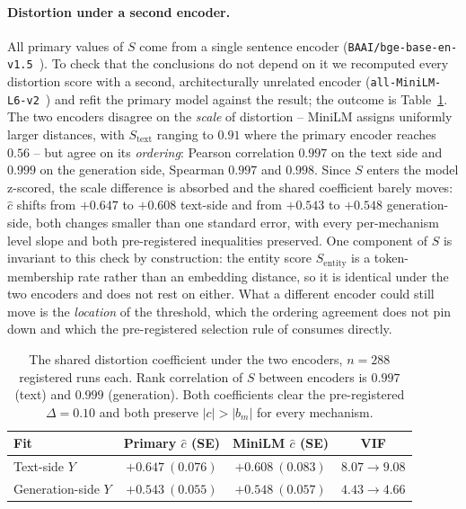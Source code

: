\paragraph{Distortion under a second encoder.}
All primary values of $S$ come from a single sentence encoder (\texttt{BAAI/\allowbreak bge-base-\allowbreak en-v1.5}~\citep{xiao2024cpack}).
To check that the conclusions do not depend on it we recomputed every distortion score with a second,
architecturally unrelated encoder (\texttt{all-\allowbreak MiniLM-\allowbreak L6-v2}~\citep{wang2020minilm, reimers2019sbert}) and refit the primary model against the result;
the outcome is Table~\ref{tab:encoder}.
The two encoders disagree on the \textit{scale} of distortion -- MiniLM assigns uniformly larger distances,
with $S_\text{text}$ ranging to $0.91$ where the primary encoder reaches $0.56$ -- but agree on its \textit{ordering}:
Pearson correlation $0.997$ on the text side and $0.999$ on the generation side,
Spearman $0.997$ and $0.998$.
Since $S$ enters the model z-scored,
the scale difference is absorbed and the shared coefficient barely moves:
$\hat c$ shifts from $+0.647$ to $+0.608$ text-side and from $+0.543$ to $+0.548$ generation-side,
both changes smaller than one standard error,
with every per-mechanism level slope and both pre-registered inequalities preserved.
One component of $S$ is invariant to this check by construction:
the entity score $S_\text{entity}$ is a token-membership rate rather than an embedding distance,
so it is identical under the two encoders and does not rest on either.
What a different encoder could still move is the \textit{location} of the threshold,
which the ordering agreement does not pin down and which the pre-registered selection rule of  consumes directly.

\begin{table}[h]
\centering
\begin{tabular}{@{}lccc@{}}
\toprule
Fit & Primary $\hat c$ (SE) & MiniLM $\hat c$ (SE) & VIF \\
\midrule
Text-side $Y$       & $+0.647\ (0.076)$ & $+0.608\ (0.083)$ & $8.07 \to 9.08$ \\
Generation-side $Y$ & $+0.543\ (0.055)$ & $+0.548\ (0.057)$ & $4.43 \to 4.66$ \\
\bottomrule
\end{tabular}
\caption{The shared distortion coefficient under the two encoders,
$n = 288$ registered runs each.
Rank correlation of $S$ between encoders is $0.997$ (text) and $0.999$ (generation).
Both coefficients clear the pre-registered $\Delta = 0.10$ and both preserve $|c| > |b_m|$ for every mechanism.}
\label{tab:encoder}
\end{table}

